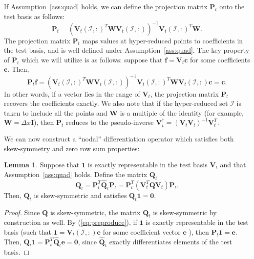 \documentclass[preprint,10pt]{elsarticle}
\theoremstyle{definition}
\theoremstyle{lemma}
\newtheorem{lemma}{Lemma}
\theoremstyle{theorem}
\theoremstyle{assumption}
\renewcommand{\hat}{\widehat}
\newcommand{\LRp}[1]{\left( #1 \right)}
\begin{document}
If Assumption~\ref{ass:quad} holds, we can define the projection matrix $\bm{P}_t$ onto the test basis as follows:
\begin{equation}
\bm{P}_t = \LRp{\bm{V}_t\LRp{\mathcal{I},:}^T\bm{W}\bm{V}_t\LRp{\mathcal{I},:}}^{-1}\bm{V}_t\LRp{\mathcal{I},:}^T\bm{W}.
\label{eq:Pt}
\end{equation}
The projection matrix $\bm{P}_t$ maps values at hyper-reduced points to coefficients in the test basis, and is well-defined under Assumption~\ref{ass:quad}.  The key property of $\bm{P}_t$ which we will utilize is as follows: suppose that $\bm{f} = \bm{V}_t\bm{c}$ for some coefficients $\bm{c}$.  Then,
\begin{equation}
\bm{P}_t \bm{f} = \LRp{\bm{V}_t\LRp{\mathcal{I},:}^T\bm{W}\bm{V}_t\LRp{\mathcal{I},:}}^{-1}\bm{V}_t\LRp{\mathcal{I},:}^T\bm{W} \bm{V}_t\LRp{\mathcal{I},:}\bm{c} = \bm{c}.
\label{eq:preproduce}
\end{equation}
In other words, if a vector lies in the range of $\bm{V}_t$, the projection matrix $\bm{P}_t$ recovers the coefficients exactly.  We also note that if the hyper-reduced set $\mathcal{I}$ is taken to include all the points and $\bm{W}$ is a multiple of the identity (for example, $\bm{W} = \Delta x \bm{I}$), then $\bm{P}_t$ reduces to the pseudo-inverse $\bm{V}_t^{\dagger} = \LRp{\bm{V}_t\bm{V}_t}^{-1}\bm{V}_t^T$.  

We can now construct a ``nodal'' differentiation operator which satisfies both skew-symmetry and zero row sum properties: 
\begin{lemma}
Suppose that $\bm{1}$ is exactly representable in the test basis $\bm{V}_t$ and that Assumption~\ref{ass:quad} holds.  Define the matrix $\bm{Q}_t$
\begin{equation}
\bm{Q}_t = \bm{P}_t^T\hat{\bm{Q}}_t\bm{P}_t = \bm{P}_t^T\LRp{\bm{V}_t^T\bm{Q}\bm{V}_t}\bm{P}_t.
\label{eq:nodalQ}
\end{equation}
Then, $\bm{Q}_t$ is skew-symmetric and satisfies $\bm{Q}_t\bm{1} = \bm{0}$.  
\label{thm:Qt}
\end{lemma}
\begin{proof}
Since $\bm{Q}$ is skew-symmetric, the matrix $\bm{Q}_t$ is skew-symmetric by construction as well.  By (\ref{eq:preproduce}), if $\bm{1}$ is exactly representable in the test basis (such that $\bm{1} = \bm{V}_t\LRp{\mathcal{I},:}\bm{e}$ for some coefficient vector $\bm{e}$  ), then  $\bm{P}_t\bm{1} = \bm{e}$.  Then, $\bm{Q}_t\bm{1} = \bm{P}_t^T\hat{\bm{Q}}_t\bm{e} = \bm{0}$, since $\hat{\bm{Q}}_t$ exactly differentiates elements of the test basis.
\end{proof}
\end{document}
